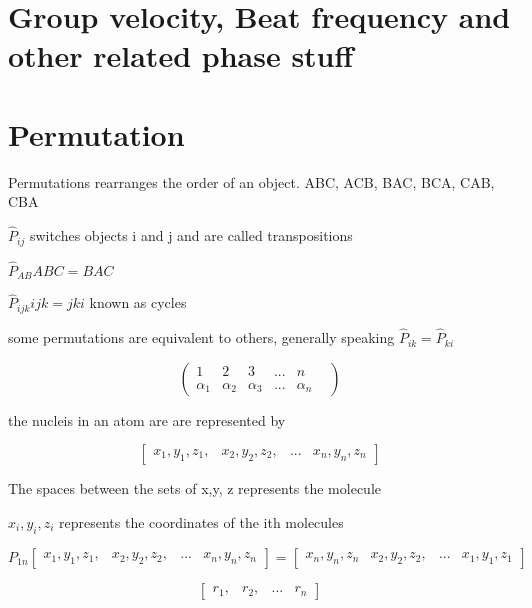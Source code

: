 \documentclass[11pt,a4paper]{book}
\begin{document}
	\section{Group velocity, Beat frequency and other related phase stuff}
	\section{Permutation}
		Permutations rearranges the order of an object. 
		ABC, ACB, BAC, BCA, CAB, CBA
		
		$\hat{P}_{ij} $ switches objects i and j and are called transpositions
		
		$\hat{P}_{AB} ABC = BAC$ 
		
		$\hat{P}_{ijk} ijk = jki$ known as cycles
		
		some permutations are equivalent to others, generally speaking $\hat{P}_{ik} = \hat{P}_{ki}$
		
		\begin{equation}
			\begin{pmatrix}
			1 & 2 & 3 & ... & n \\
			\alpha_1 & \alpha_2 & \alpha_3 & ... & \alpha_n &
			\end{pmatrix}
		\end{equation}
		
		the nucleis in an atom are are represented by
		
		\begin{equation}
			\begin{bmatrix}
			x_1, y_1, z_1, & x_2,  y_2,  z_2,& ... & x_n, y_n, z_n
			\end{bmatrix}
		\end{equation}
		
		The spaces between the sets of x,y, z represents the molecule 
		
		$x_i, y_i, z_i$ represents the coordinates of the ith molecules
		
		$P_{1n} 			
		\begin{bmatrix}
		x_1, y_1, z_1, & x_2,  y_2,  z_2,& ... & x_n, y_n, z_n
		\end{bmatrix} 
		=
		\begin{bmatrix}
		x_n, y_n, z_n & x_2,  y_2,  z_2,& ... & x_1, y_1, z_1
		\end{bmatrix} 
		$
		
		\begin{equation}
			\begin{bmatrix}
				r_1, & r_2, & ... & r_n
			\end{bmatrix}
		\end{equation}
		
\end{document}
